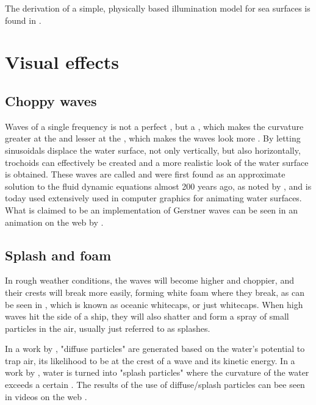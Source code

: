 The derivation of a simple, physically based illumination model for sea surfaces is found in .
\section{Visual effects}

\subsection{Choppy waves}

Waves of a single frequency is not a perfect \sinusoidal, but a \trochoid, which makes the curvature greater at the  and lesser at the , which makes the waves look more . By letting sinusoidals displace the water surface, not only vertically, but also horizontally, trochoids can effectively be created and a more realistic look of the water surface is obtained. These waves are called  and were first found as an approximate solution to the fluid dynamic equations almost 200 years ago, as noted by \citet{Tessendorf2001}, and is today used extensively used in computer graphics for animating water surfaces. What is claimed to be an implementation of Gerstner waves can be seen in an animation on the web by \citet{ceribral2012}.

\subsection{Splash and foam}

In rough weather conditions, the waves will become higher and choppier, and their crests will break more easily, forming white foam where they break, as can be seen in , which is known as oceanic whitecaps, or just whitecaps. When high waves hit the side of a ship, they will also shatter and form a spray of small particles in the air, usually just referred to as splashes.

In a work by \citet{Ihmsen2012}, "diffuse particles" are generated based on the water's potential to trap air, its likelihood to be at the crest of a wave and its kinetic energy. In a work by \citet{Takahashi2003}, water is turned into "splash particles" where the curvature of the water exceeds a certain \threshold. The results of the use of diffuse/splash particles can bee seen in videos on the web \citep{Chandel2009,RealFlowLabs2011,Ihmsen2012}.

